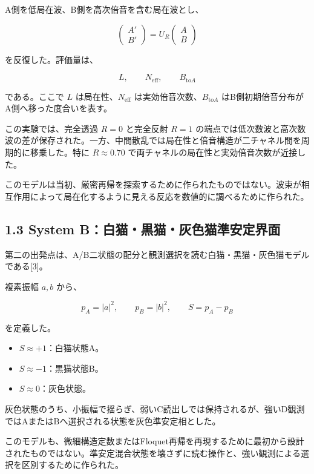 \documentclass[
  10pt,
  a4paper,
]{article}
\providecommand{\tightlist}{%
  \setlength{\itemsep}{0pt}\setlength{\parskip}{0pt}}
\begin{document}
A側を低局在波、B側を高次倍音を含む局在波とし、

\[
\begin{pmatrix}
A'\\B'
\end{pmatrix}
=
U_R
\begin{pmatrix}
A\\B
\end{pmatrix}
\]

を反復した。評価量は、

\[
L,\qquad N_{\mathrm{eff}},\qquad B_{\mathrm{to}A}
\]

である。ここで \(L\) は局在性、\(N_{\mathrm{eff}}\)
は実効倍音次数、\(B_{\mathrm{to}A}\)
はB側初期倍音分布がA側へ移った度合いを表す。

この実験では、完全透過 \(R=0\) と完全反射 \(R=1\)
の端点では低次数波と高次数波の差が保存された。一方、中間散乱では局在性と倍音構造が二チャネル間を周期的に移乗した。特に
\(R\approx0.70\) で両チャネルの局在性と実効倍音次数が近接した。

このモデルは当初、厳密再帰を探索するために作られたものではない。波束が相互作用によって局在化するように見える反応を数値的に調べるために作られた。

\subsection{1.3 System
B：白猫・黒猫・灰色猫準安定界面}\label{system-bux767dux732bux9ed2ux732bux7070ux8272ux732bux6e96ux5b89ux5b9aux754cux9762}

第二の出発点は、A/B二状態の配分と観測選択を読む白猫・黒猫・灰色猫モデルである{[}3{]}。

複素振幅 \(a,b\) から、

\[
p_A=|a|^2,\qquad
p_B=|b|^2,
\qquad
S=p_A-p_B
\]

を定義した。

\begin{itemize}
\tightlist
\item
  \(S\approx+1\)：白猫状態A。
\item
  \(S\approx-1\)：黒猫状態B。
\item
  \(S\approx0\)：灰色状態。
\end{itemize}

灰色状態のうち、小振幅で揺らぎ、弱いC読出しでは保持されるが、強いD観測ではAまたはBへ選択される状態を灰色準安定相とした。

このモデルも、微細構造定数またはFloquet再帰を再現するために最初から設計されたものではない。準安定混合状態を壊さずに読む操作と、強い観測による選択を区別するために作られた。
\end{document}
